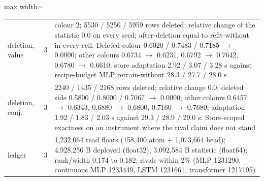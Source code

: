 \documentclass{article} %
\begin{document}
\begin{table}[h]
\begin{adjustbox}{max width=\linewidth}
\begin{tabular}{p{1.9cm}p{1.2cm}p{10.0cm}}
deletion, value & 3 & colour 2; 5530 / 5250 / 5959 rows deleted; relative change of the statistic 0.0 on every seed; after-deletion equal to refit-without in every cell. Deleted colour 0.6020 / 0.7483 / 0.7185 $\to$ 0.0000; other colours 0.6734 $\to$ 0.6231, 0.6792 $\to$ 0.7642, 0.6780 $\to$ 0.6610; store adaptation 2.92 / 3.07 / 3.28 s against recipe-budget MLP retrain-without 28.3 / 27.7 / 28.0 s \\
deletion, conj. & 3 & 2240 / 1435 / 2168 rows deleted; relative change 0.0; deleted side 0.5800 / 0.8000 / 0.7067 $\to$ 0.0000; other colours 0.6457 $\to$ 0.6343, 0.6880 $\to$ 0.6800, 0.7160 $\to$ 0.7680; adaptation 1.92 / 1.83 / 2.03 s against 29.3 / 28.9 / 29.0 s. Store-scoped exactness on an instrument where the rival claim does not stand \\
ledger & 3 & 1,232,064 read floats (158,400 atom + 1,073,664 head); 4,928,256 B deployed (float32); 3,092,584 B statistic (float64); rank/width 0.174 to 0.182; rivals within 2\% (MLP 1231290, continuous MLP 1233449, LSTM 1231661, transformer 1217195) \\
\bottomrule
\end{tabular}\end{adjustbox}
\end{table}

\end{document}
